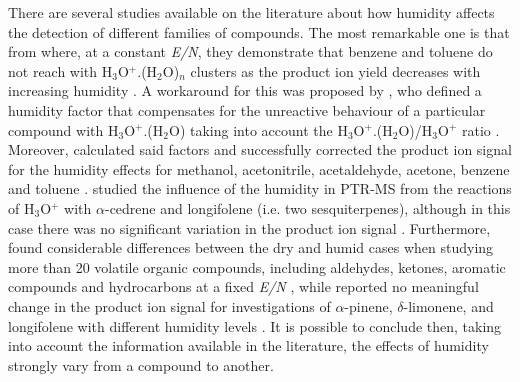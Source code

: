 There are several studies available on the literature about how humidity affects the detection of different families of compounds. The most remarkable one is that from \citeauthor{warneke2001measurements} where, at a constant \textit{E/N}, they demonstrate that  benzene and toluene do not reach with H$_3$O$^+$.(H$_2$O)$_n$ clusters as the product ion yield decreases with increasing humidity \cite{warneke2001measurements}. A workaround for this was proposed by \citeauthor{doi:10.1029/2003JD003863}, who defined a humidity factor that compensates for the unreactive behaviour  of a particular compound with H$_3$O$^+$.(H$_2$O) taking into account the H$_3$O$^+$.(H$_2$O)/H$_3$O$^+$ ratio \cite{doi:10.1029/2003JD003863}.  
Moreover, \citeauthor{de2007measurements} calculated said factors and successfully corrected the product ion signal for the humidity effects for  methanol, acetonitrile, acetaldehyde, acetone, benzene and toluene \cite{de2007measurements}.
\citeauthor{demarcke2009laboratory} studied the influence of the humidity in PTR-MS from the reactions of H$_3$O$^+$ with  $\alpha$-cedrene and longifolene (i.e. two sesquiterpenes), although in this case there was no significant variation in the product ion signal  \cite{demarcke2009laboratory}.
Furthermore, \citeauthor{trefz2018effects} found considerable differences between the dry and humid cases when studying more than 20 volatile organic compounds, including aldehydes, ketones, aromatic compounds and hydrocarbons at a fixed \textit{E/N} \cite{trefz2018effects}, while \citeauthor{kari2018ptr} reported no meaningful change in the product ion signal for investigations of $\alpha$-pinene, $\delta$-limonene, and longifolene with different humidity levels \cite{kari2018ptr}.
It is possible to conclude then, taking into account the information available in the literature, the effects of humidity strongly vary from a compound to another.



